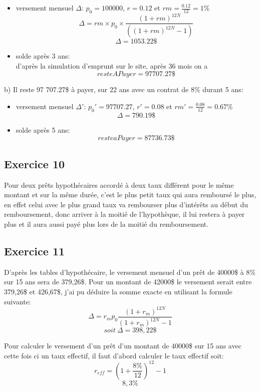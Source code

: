 \documentclass[12pt]{article}
\begin{document}
\begin{itemize}[label=$\bullet$]
\item versement mensuel $\Delta$: $p_0=100000$, $r=0.12$ et $rm=\frac{0.12}{12}=1\%$
$$ \Delta = rm \times p_0 \times \frac{(1+rm)^{12N}}{((1+rm)^{12N}-1)}$$
$$\Delta=1053.22\$$$
\item solde après 3 ans: \\d'après la simulation d'emprunt sur le site, après 36 mois on a
$$resteAPayer = 97707.27\$$$
\end{itemize}
b) Il reste 97 707.27\$ à payer, sur 22 ans avec un contrat de 8\% durant 5 ans:
\begin{itemize}[label=$\bullet$]
\item versement mensuel $\Delta'$: $p_0'=97707.27$, $r'=0.08$ et $rm'=\frac{0.08}{12}=0.67\%$\\
$$\Delta = 790.19\$$$
\item solde après 5 ans: 
$$resteaPayer = 87736.73\$$$
\end{itemize}

\subsection{Exercice 10}

\qquad Pour deux prêts hypothécaires accordé à deux taux différent pour le même montant et sur la même durée, c'est le plus petit taux qui aura remboursé le plus, en effet celui avec le plus grand taux va rembourser plus d'intérêts au début du remboursement, donc arriver à la moitié de l'hypothèque, il lui restera à payer plus et il aura aussi payé plus lors de la moitié du remboursement.
\newpage
\subsection{Exercice 11}

\qquad D'après les tables d'hypothécaire, le versement mensuel d'un prêt de 40000\$ à 8\% sur 15 ans sera de 379,26\$. Pour un montant de 42000\$ le versement serait entre 379,26\$ et 426,67\$, j'ai pu déduire la somme exacte en utilisant la formule suivante:
$$ \Delta = r_mp_0 \frac{(1+r_m)^{12N}}{(1+r_m)^{12N}-1}$$
$$ soit\ \Delta = 398,22\$ $$

Pour calculer le versement d'un prêt d'un montant de 40000\$ sur 15 ans avec cette fois ci un taux effectif, il faut d'abord calculer le taux effectif soit:
$$ r_{eff} = (1+ \frac{8\%}{12})^{12}-1 $$
$$ 8,3\%$$
\end{document}
